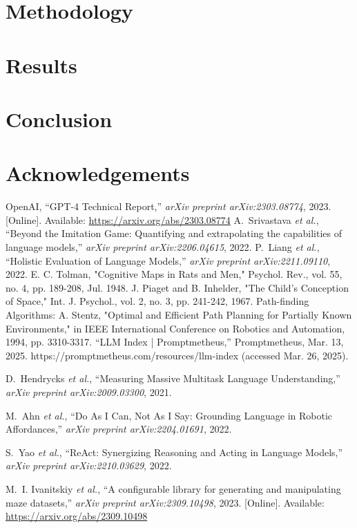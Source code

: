 \documentclass[conference]{IEEEtran}
\begin{document}
\section{Methodology}

\section{Results}

\section{Conclusion}

\section{Acknowledgements}

\begin{thebibliography}{00}

OpenAI, ``GPT-4 Technical Report,'' \emph{arXiv preprint arXiv:2303.08774}, 2023. [Online]. Available: \url{https://arxiv.org/abs/2303.08774}
A.~Srivastava \emph{et al.}, ``Beyond the Imitation Game: Quantifying and extrapolating the capabilities of language models,'' \emph{arXiv preprint arXiv:2206.04615}, 2022.
P.~Liang \emph{et al.}, ``Holistic Evaluation of Language Models,'' \emph{arXiv preprint arXiv:2211.09110}, 2022.
 E. C. Tolman, "Cognitive Maps in Rats and Men," Psychol. Rev., vol. 55, no. 4, pp. 189-208, Jul. 1948.
 J. Piaget and B. Inhelder, "The Child's Conception of Space," Int. J. Psychol., vol. 2, no. 3, pp. 241-242, 1967.
 Path-finding Algorithms: A. Stentz, "Optimal and Efficient Path Planning for Partially Known Environments," in IEEE International Conference on Robotics and Automation, 1994, pp. 3310-3317.
 “LLM Index | Promptmetheus,” Promptmetheus, Mar. 13, 2025. https://promptmetheus.com/resources/llm-index (accessed Mar. 26, 2025).


D.~Hendrycks \emph{et al.}, ``Measuring Massive Multitask Language Understanding,'' \emph{arXiv preprint arXiv:2009.03300}, 2021.

M.~Ahn \emph{et al.}, ``Do As I Can, Not As I Say: Grounding Language in Robotic Affordances,'' \emph{arXiv preprint arXiv:2204.01691}, 2022.

S.~Yao \emph{et al.}, ``ReAct: Synergizing Reasoning and Acting in Language Models,'' \emph{arXiv preprint arXiv:2210.03629}, 2022.

M.~I. Ivanitskiy \emph{et al.}, ``A configurable library for generating and manipulating maze datasets,'' \emph{arXiv preprint arXiv:2309.10498}, 2023. [Online]. Available: \url{https://arxiv.org/abs/2309.10498}

\end{thebibliography}
\end{document}
